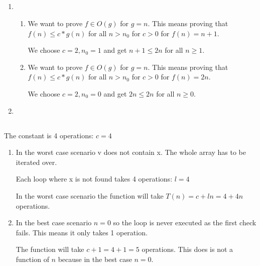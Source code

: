 \documentclass[12pt]{article}
\begin{document}
\subsection{} %
\begin{enumerate}[a]
	\item %
	\begin{enumerate}[a]
		\item %
		We want to prove $f \in O(g)$ for $g = n$. This means proving that $f(n) \leq c * g(n)$ for all $n > n_0$ for $c > 0$ for $f(n) = n + 1$.

		We choose $c = 2, n_0 = 1$ and get $n + 1 \leq 2n$ for all $n \geq 1$.

		\item %
		We want to prove $f \in O(g)$ for $g = n$. This means proving that $f(n) \leq c * g(n)$ for all $n > n_0$ for $c > 0$ for $f(n) = 2n$.

		We choose $c = 2, n_0 = 0$ and get $2n \leq 2n$ for all $n \geq 0$.
	\end{enumerate}

	\item %
\end{enumerate}

\subsection{} %
The constant is 4 operations: $c = 4$

\begin{enumerate}[a]
	\item %
	In the worst case scenario v does not contain x. The whole array has to be iterated over.

	Each loop where x is not found takes 4 operations: $l = 4$

	In the worst case scenario the function will take $T(n) = c + ln = 4 + 4n$ operations.

	\item %
	In the best case scenario $n = 0$ so the loop is never executed as the first check fails. This means it only takes 1 operation.

	The function will take $c + 1 = 4 + 1 = 5$ operations. This does is not a function of $n$ because in the best case $n = 0$.
\end{enumerate}
\end{document}

